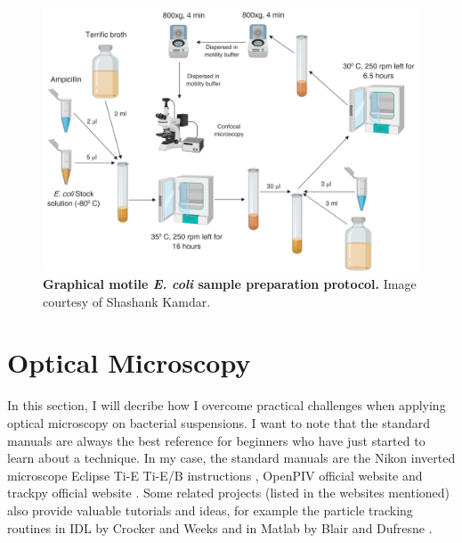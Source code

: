 \begin{figure}[ht]
	\begin{center}
	\includegraphics[width=5.5 in]{Figs/2-Exp/2.pdf}
	\end{center}
	\caption[Graphical motile \textit{E. coli} sample preparation protocol]
	{
	\textbf{Graphical motile \textit{E. coli} sample preparation protocol.}
	Image courtesy of Shashank Kamdar.
	}
	\label{fig:2-2}
\end{figure}





\section{Optical Microscopy}
\label{sec:optical-microscopy}

In this section, I will decribe how I overcome practical challenges when applying optical microscopy on bacterial suspensions. I want to note that the standard manuals are always the best reference for beginners who have just started to learn about a technique. In my case, the standard manuals are the Nikon inverted microscope Eclipse Ti-E Ti-E/B instructions \cite{NikonTiEManual}, OpenPIV official website \cite{OpenPIV-website, OpenPIV-paper} and trackpy official website \cite{trackpy-website}. Some related projects (listed in the websites mentioned) also provide valuable tutorials and ideas, for example the particle tracking routines in IDL by Crocker and Weeks \cite{IDL-tracking} and in Matlab by Blair and Dufresne \cite{Matlab-tracking}.


